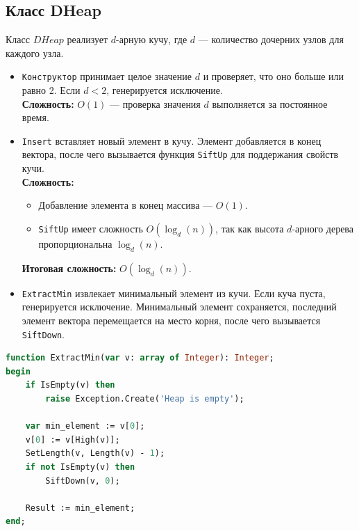 \subsection{Класс DHeap}

Класс $DHeap$ реализует $d$-арную кучу, где $d$ — количество дочерних узлов для каждого узла.

\begin{itemize}[label=•, labelsep=1em]
    \item \texttt{Конструктор} принимает целое значение $d$ и проверяет, что оно больше или равно 2. Если $d < 2$, генерируется исключение.\\
    \textbf{Сложность:} $O(1)$ — проверка значения $d$ выполняется за постоянное время.
\end{itemize}

\begin{itemize}[label=•, labelsep=1em]
    \item \texttt{Insert} вставляет новый элемент в кучу. Элемент добавляется в конец вектора, после чего вызывается функция \texttt{SiftUp} для поддержания свойств кучи.\\
    \textbf{Сложность:}
    \begin{itemize}
        \item Добавление элемента в конец массива — $O(1)$.
        \item \texttt{SiftUp} имеет сложность $O(\log_d(n))$, так как высота $d$-арного дерева пропорциональна $\log_d(n)$.
    \end{itemize}
    \textbf{Итоговая сложность:} $O(\log_d(n))$.
\end{itemize}

\begin{itemize}[label=•, labelsep=1em]
    \item \texttt{ExtractMin} извлекает минимальный элемент из кучи. Если куча пуста, генерируется исключение. Минимальный элемент сохраняется, последний элемент вектора перемещается на место корня, после чего вызывается \texttt{SiftDown}.
\end{itemize}

\begin{lstlisting}[language=Pascal]
function ExtractMin(var v: array of Integer): Integer;
begin
    if IsEmpty(v) then
        raise Exception.Create('Heap is empty');

    var min_element := v[0];
    v[0] := v[High(v)];
    SetLength(v, Length(v) - 1);
    if not IsEmpty(v) then
        SiftDown(v, 0);

    Result := min_element;
end;
\end{lstlisting}


